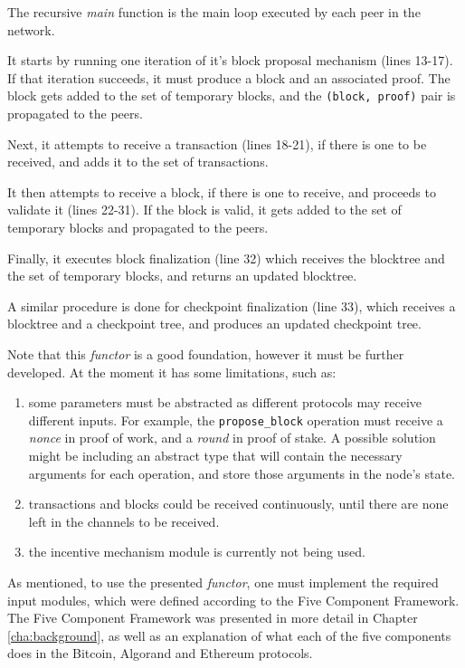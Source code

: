 The recursive \textit{main} function is the main loop executed by each peer in the network.

It starts by running one iteration of it's block proposal mechanism (lines 13-17). If that iteration succeeds, it must produce a block and an associated proof. The block gets added to the set of temporary blocks, and the \texttt{(block, proof)} pair is propagated to the peers.

Next, it attempts to receive a transaction (lines 18-21), if there is one to be received, and adds it to the set of transactions.

It then attempts to receive a block, if there is one to receive, and proceeds to validate it (lines 22-31). If the block is valid, it gets added to the set of temporary blocks and propagated to the peers.

Finally, it executes block finalization (line 32) which receives the blocktree and the set of temporary blocks, and returns an updated blocktree.

A similar procedure is done for checkpoint finalization (line 33), which receives a blocktree and a checkpoint tree, and produces an updated checkpoint tree.

\vspace{0.75cm}

Note that this \textit{functor} is a good foundation, however it must be further developed. At the moment it has some limitations, such as:

\begin{enumerate}
    \item some parameters must be abstracted as different protocols may receive different inputs. For example, the \texttt{propose\_block} operation must receive a \textit{nonce} in proof of work, and a \textit{round} in proof of stake. A possible solution might be including an abstract type that will contain the necessary arguments for each operation, and store those arguments in the node's state.
    \item transactions and blocks could be received continuously, until there are none left in the channels to be received.
    \item the incentive mechanism module is currently not being used.
\end{enumerate}



\vspace{0.2cm}

As mentioned, to use the presented \textit{functor}, one must implement the required input modules, which were defined according to the Five Component Framework. The Five Component Framework was presented in more detail in Chapter \ref{cha:background}, as well as an explanation of what each of the five components does in the Bitcoin, Algorand and Ethereum protocols.

